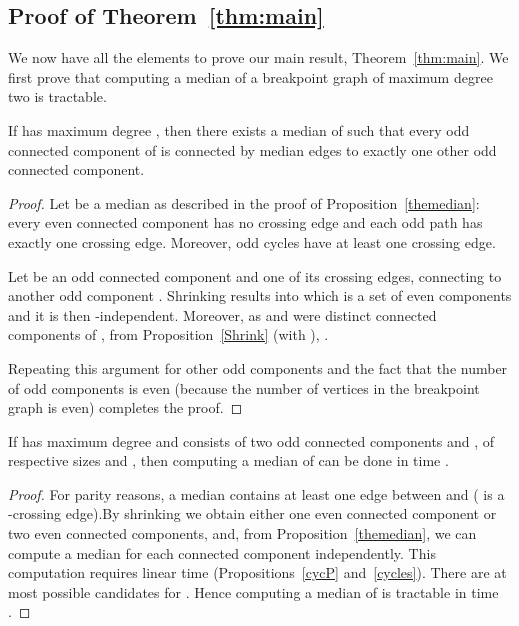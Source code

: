 \documentclass[10pt]{llncs}
\begin{document}
\subsection{Proof of Theorem~\ref{thm:main}}

We now have all the elements to prove our main result,
Theorem~\ref{thm:main}. We first prove that computing a median of a
breakpoint graph of maximum degree two is tractable.

\begin{lemma}\label{linkage}
  If  has maximum degree , then there exists a median of  such
  that every odd connected component of  is connected by median
  edges to exactly one other odd connected component.
\end{lemma}

\begin{proof}
  Let  be a median as described in the proof of
  Proposition~\ref{themedian}: every even connected component has no
  crossing edge and each odd path has exactly one crossing
  edge. Moreover, odd cycles have at least one crossing edge.

  Let  be an odd connected component and  one of its crossing
  edges, connecting  to another odd component . Shrinking 
  results into  which is a set of even components
  and it is then -independent. Moreover, as  and  were
  distinct connected components of , from Proposition~\ref{Shrink}
  (with ), . 

  Repeating this argument for other odd components and the fact that
  the number of odd components is even (because the number of vertices
  in the breakpoint graph is even) completes the proof. \end{proof}


\begin{lemma}\label{pair}
  If  has maximum degree  and consists of two odd connected
  components  and , of respective sizes  and ,
  then computing a median of  can be done in time .
\end{lemma}

\begin{proof}
    For parity reasons, a median  contains at least one edge 
    between  and  ( is a -crossing edge).By shrinking  we obtain either one even connected component or
    two even connected components, and, from
    Proposition~\ref{themedian}, we can compute a median for each
    connected component independently. This computation requires
    linear time (Propositions~\ref{cycP} and~\ref{cycles}). There are
    at most  possible candidates for
    . Hence computing a median of  is tractable in time
    . \end{proof}
\end{document}
